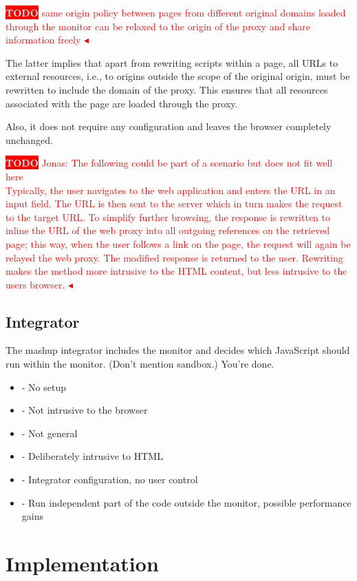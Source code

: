 \documentclass{llncs}
\newcommand{\todo}[1]{\colorbox{red}{\textcolor{white}{\sffamily\bfseries\scriptsize TODO}} \textcolor{red}{#1} \textcolor{red}{$\blacktriangleleft$}}
\begin{document}
\todo{same origin policy between pages from different original domains loaded through the monitor can be relaxed to the origin of the proxy and share information freely}





The latter implies that apart from rewriting scripts within a page, all URLs to external resources, i.e., to origins outside the scope of the original origin, must be rewritten to include the domain of the proxy. This ensures that all resources associated with the page are loaded through the proxy.

Also, it does not require any configuration and leaves the browser 
completely unchanged.

\todo{Jonas: The following could be part of a scenario but does not fit well here \\
Typically, the user navigates to the web application and enters the URL in 
an input field. The URL is then sent to the server which in turn makes the request to the 
target URL. To simplify further 
browsing, the response is rewritten to inline the URL of the web proxy 
into all outgoing references on the retrieved page; this way, when the user 
follows a link on the page, the request will again be relayed the web proxy. 
The modified response is returned to the user. Rewriting makes the method more 
intrusive to the HTML content, but less intrusive to the users browser.
}

\subsection{Integrator}

The mashup integrator includes the monitor and decides which JavaScript should 
run within the monitor. (Don't mention sandbox.) You're done.
\begin{itemize}
\item- No setup
\item- Not intrusive to the browser
\item- Not general
\item- Deliberately intrusive to HTML
\item- Integrator configuration, no user control
\item- Run independent part of the code outside the monitor, possible performance gains
\end{itemize}


\section{Implementation}
\label{sec:impl}
\end{document}
